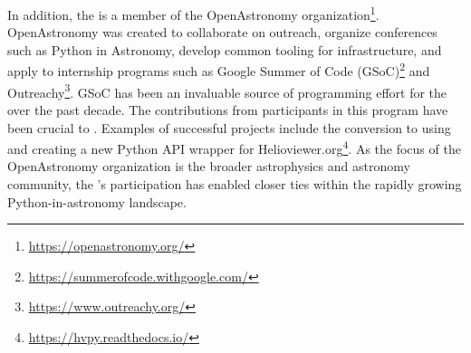 In addition, the \sunpyproj is a member of the OpenAstronomy organization\footnote{\url{https://openastronomy.org/}}.
OpenAstronomy was created to collaborate on outreach, organize conferences such as Python in Astronomy, develop common tooling for infrastructure, and apply to internship programs such as Google Summer of Code (GSoC)\footnote{\url{https://summerofcode.withgoogle.com/}} and Outreachy\footnote{\url{https://www.outreachy.org/}}.
GSoC has been an invaluable source of programming effort for the \sunpyproj over the past decade.
The contributions from participants in this program have been crucial to \sunpypkg.
Examples of successful projects include the conversion to using  and creating a new Python API wrapper for Helioviewer.org\footnote{\url{https://hvpy.readthedocs.io/}}.
As the focus of the OpenAstronomy organization is the broader astrophysics and astronomy community, the \sunpyproj's participation has enabled closer ties within the rapidly growing  Python-in-astronomy landscape.
